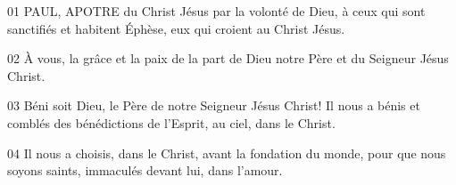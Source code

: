 01 PAUL, APOTRE du Christ Jésus par la volonté de Dieu, à ceux qui sont sanctifiés et habitent Éphèse, eux qui croient au Christ Jésus.

02 À vous, la grâce et la paix de la part de Dieu notre Père et du Seigneur Jésus Christ.

03 Béni soit Dieu, le Père de notre Seigneur Jésus Christ! Il nous a bénis et comblés des bénédictions de l’Esprit, au ciel, dans le Christ.

04 Il nous a choisis, dans le Christ, avant la fondation du monde, pour que nous soyons saints, immaculés devant lui, dans l’amour.
